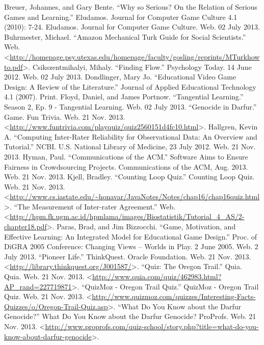 \documentclass[12pt]{report}
\begin{document}
\begin{thebibliography}{1}

\bibitem{} Breuer, Johannes, and Gary Bente. ``Why so Serious? On the Relation of Serious Games and Learning.'' Eludamos. Journal for Computer Game Culture 4.1 (2010): 7-24. Eludamos. Journal for Computer Game Culture. Web. 02 July 2013.
\bibitem{} Buhrmester, Michael. ``Amazon Mechanical Turk Guide for Social Scientists.'' Web. \textless \url{http://homepage.psy.utexas.edu/homepage/faculty/gosling/reprints/MTurkhowto.pdf}\textgreater.
\bibitem{} Csikszentmihalyi, Mihaly. ``Finding Flow.'' Psychology Today. 14 June 2012. Web. 02 July 2013.
\bibitem{} Dondlinger, Mary Jo. ``Educational Video Game Design: A Review of the Literature.'' Journal of Applied Educational Technology 4.1 (2007). Print.
\bibitem{} Floyd, Daniel, and James Portnow. ``Tangential Learning.'' Season 2, Ep. 9 - Tangential Learning. Web. 02 July 2013.
\bibitem{} ``Genocide in Darfur.'' Game. Fun Trivia. Web. 21 Nov. 2013. \textless \url{http://www.funtrivia.com/playquiz/quiz2560151d4fc10.html}\textgreater.
\bibitem{} Hallgren, Kevin A. ``Computing Inter-Rater Reliability for Observational Data: An Overview and Tutorial.'' NCBI. U.S. National Library of Medicine, 23 July 2012. Web. 21 Nov. 2013.
\bibitem{} Hyman, Paul. ``Communications of the ACM.'' Software Aims to Ensure Fairness in Crowdsourcing Projects. Communications of the ACM, Aug. 2013. Web. 21 Nov. 2013.
\bibitem{} Kjell, Bradley. ``Counting Loop Quiz.'' Counting Loop Quiz. Web. 21 Nov. 2013. \textless \url{http://www.cs.iastate.edu/~honavar/JavaNotes/Notes/chap16/chap16quiz.html}\textgreater.
\bibitem{} ``The Measurement of Inter-rater Agreement.'' Web. \textless \url{http://hpm.fk.ugm.ac.id/hpmlama/images/Biostatistik/Tutorial\_4\_AS/2-chapter18.pdf}\textgreater.
\bibitem{} Paras, Brad, and Jim Bizzocchi. ``Game, Motivation, and Effective Learning: An Integrated Model for Educational Game Design.'' Proc. of DiGRA 2005 Conference: Changing Views – Worlds in Play. 2 June 2005. Web. 2 July 2013.
\bibitem{} ``Pioneer Life.'' ThinkQuest. Oracle Foundation. Web. 21 Nov. 2013. \textless \url{http://library.thinkquest.org/J001587/}\textgreater.
\bibitem{} ``Quiz: The Oregon Trail.'' Quia. Quia. Web. 21 Nov. 2013. \textless \url{http://www.quia.com/quiz/462983.html?AP\_rand=227719871}\textgreater.
\bibitem{} ``QuizMoz - Oregon Trail Quiz.'' QuizMoz - Oregon Trail Quiz. Web. 21 Nov. 2013. \textless \url{http://www.quizmoz.com/quizzes/Interesting-Facts-Quizzes/o/Oregon-Trail-Quiz.asp}\textgreater.
\bibitem{} ``What Do You Know about the Darfur Genocide?'' What Do You Know about the Darfur Genocide? ProProfs. Web. 21 Nov. 2013. \textless \url{http://www.proprofs.com/quiz-school/story.php?title=what-do-you-know-about-darfur-genocide}\textgreater.

\end{thebibliography}
\end{document}
